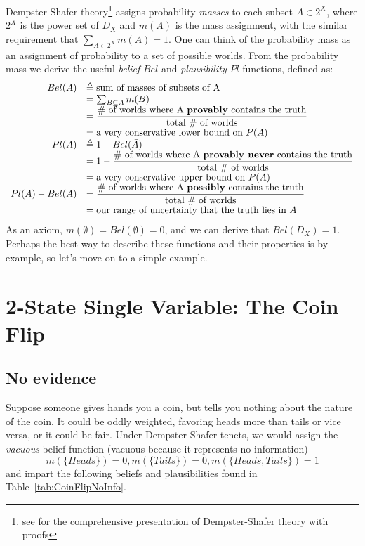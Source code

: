 \documentclass[letterpaper]{article}
\begin{document}
Dempster-Shafer theory\footnote{see \cite{Shafer1976} for the comprehensive presentation of Dempster-Shafer theory with proofs} assigns probability \textit{masses} to each subset $A \in 2^X$, where $2^X$ is the power set of $D_X$ and $m(A)$ is the mass assignment, with the similar requirement that $\sum_{A \in 2^{X}}m(A) = 1$.  One can think of the probability mass as an assignment of probability to a set of possible worlds.  
From the probability mass we derive the useful \textit{belief} $Bel$ and \textit{plausibility} $Pl$ functions, defined as:
\[
\begin{array}{rl}
Bel(A) & \triangleq \text{sum of masses of subsets of A}\\
	& = \sum_{B \subseteq A} m(B)\\
	& = \dfrac{\text{\# of worlds where A \textbf{provably} contains the truth}}{\text{total \# of worlds}}\\
	& = \text{a very conservative lower bound on } P(A)\\
Pl(A) & \triangleq 1-Bel(\bar{A})\\
	& = 1-\dfrac{\text{\# of worlds where A \textbf{provably never} contains the truth}}{\text{total \# of worlds}}\\
	& = \text{a very conservative upper bound on } P(A)\\
Pl(A)-Bel(A) & = \dfrac{\text{\# of worlds where A \textbf{possibly} contains the truth}}{\text{total \# of worlds}}\\
	& = \text{our range of uncertainty that the truth lies in } A
\end{array}
\]
As an axiom, $m(\emptyset)=Bel(\emptyset)=0$, and we can derive that $Bel(D_X)=1$.  Perhaps the best way to describe these functions and their properties is by example, so let's move on to a simple example.

\section{2-State Single Variable: The Coin Flip}
\subsection{No evidence}
Suppose someone gives hands you a coin, but tells you nothing about the nature of the coin.  It could be oddly weighted, favoring heads more than tails or vice versa, or it could be fair.  Under Dempster-Shafer tenets, we would assign the \textit{vacuous} belief function (vacuous because it represents no information)
\[ m(\{Heads\}) = 0, m(\{Tails\}) = 0, m(\{Heads,Tails\})=1 \]
and impart the following beliefs and plausibilities found in Table~\ref{tab:CoinFlipNoInfo}.
\end{document}
